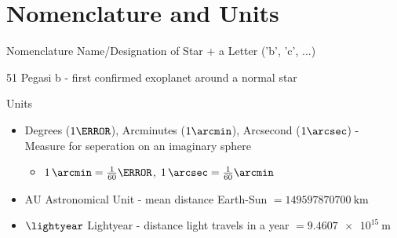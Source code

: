 \documentclass[presentation,t,aspectratio=169]{beamer}
\begin{document}
\section{Nomenclature and Units}
\begin{frame}
  \begin{block}{Nomenclature}    
     Name/Designation of Star +  a Letter ('b', 'c', ...)
   \end{block}
   \pause
  \begin{example}
    51 Pegasi b - first confirmed exoplanet around a normal star
  \end{example}
  \pause
  \begin{block}{Units}
    \begin{itemize}
    \item Degrees ($1\degree$), Arcminutes ($1\arcmin$), Arcsecond ($1\arcsec$) - Measure for seperation on an imaginary sphere
      \begin{itemize}
      \item $\SI{1}{\arcmin}= \frac{1}{60} \degree$,  $\SI{1}{\arcsec}= \frac{1}{60} \arcmin$
      \end{itemize}
    \item $\mathrm{AU}$ Astronomical Unit - mean distance Earth-Sun $= \SI{149597870700}{\km}$
    \item $\lightyear$ Lightyear - distance light travels in a year $= \SI{9.4607e15}{\meter}$
    \end{itemize}
  \end{block}
\end{frame}

\end{document}
